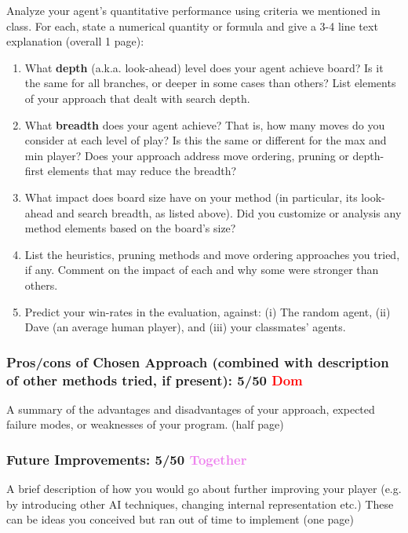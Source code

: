 \documentclass[12pt, letterpaper]{article}
\begin{document}
        Analyze your agent's quantitative performance using  criteria we mentioned in class. For each, state a numerical quantity or formula and give a 3-4 line text explanation (overall 1 page):
        \begin{enumerate}
            \item What \textbf{depth} (a.k.a. look-ahead) level does your agent achieve  board? Is it the same for all branches, or deeper in some cases than others? List elements of your approach that dealt with search depth.
            \item What \textbf{breadth} does your agent achieve? That is, how many moves do you consider at each level of play? Is this the same or different for the max and min player? Does your approach address move ordering, pruning or  depth-first elements that may reduce the breadth?
            \item What impact does board size have on your method (in particular, its look-ahead and search breadth, as listed above). Did you customize or analysis any method elements based on the board's size?
            \item List the heuristics, pruning methods and move ordering approaches you tried, if any. Comment on the impact of each and why some were stronger than others.
            \item Predict your win-rates in the evaluation, against: (i) The random agent, (ii) Dave (an average human player), and (iii) your classmates' agents.
        \end{enumerate}
    
\subsubsection*{Pros/cons of Chosen Approach (combined with description of other methods tried, if present): 5/50 \textcolor{red}{Dom}}
    
    A summary of the advantages and disadvantages of your approach, expected failure modes, or weaknesses of your program. (half page)
    
\subsubsection*{Future Improvements: 5/50 \textcolor{violet}{Together}}

    A brief description of how you would go about further improving your player (e.g. by introducing other AI techniques, changing internal representation etc.) These can be ideas you conceived but ran out of time to implement (one page)






\pagebreak
\end{document}
